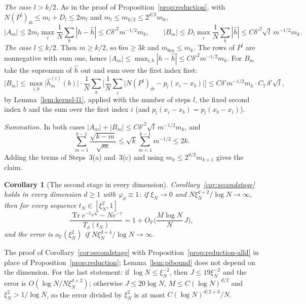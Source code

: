 \documentclass[11pt,a4paper]{article}
\makeatletter
\theoremstyle{stmt}
\newtheorem{corollary}[theorem]{Corollary}
\theoremstyle{defn}
\theoremstyle{rmk}
\renewenvironment{proof}[1][\proofname]{\par\pushQED{\qed}\normalfont\topsep6\p@\@plus6\p@\relax
  \trivlist\item[\hskip\labelsep{\sffamily\itshape\small #1.}]\ignorespaces}{\popQED\endtrivlist\@endpefalse}
\numberwithin{equation}{section}
\DeclareMathOperator{\Tr}{Tr}
\newcommand{\Lc}{\mathcal{L}}
\makeatother
\begin{document}
{\begin{proof}
\emph{The case $l>k/2$.} As in the proof of Proposition~\ref{prop:reduction}, with
$N(P^l)_{ib}\le m_l+D_l\le2m_l$ and $m_l\le m_{k/2}\le2^{d/2}m_k$,
\[
 |A_m|\le2m_l\max_i\frac1N\sum_b|h-\hat h|\le C\delta'^2m^{-1/2}m_k,\qquad
 |B_m|\le D_l\max_i\frac1N\sum_b|\hat h|\le C\delta'^2\sqrt l\,m^{-1/2}m_k .
\]
\emph{The case $l\le k/2$.} Then $m\ge k/2$, so $6m\ge3k$ and $m_{6m}\le m_k$. The rows of $P^l$ are
nonnegative with sum one, hence $|A_m|\le\max_{i,b}|h-\hat h|\le C\delta'^2m^{-1/2}m_k$. For $B_m$ take the
supremum of $\hat h$ out and sum over the first index first:
\[
 |B_m|\le\max_{i,b}\big|\hat h^{(i)}_m(b)\big|\cdot\frac1N\sum_b\Big[\frac1N\sum_i\big|N(P^l)_{ib}-p_l(x_i-x_b)\big|\Big]
 \le C\delta'm^{-1/2}m_k\cdot C_7\,\delta'\sqrt l ,
\]
by Lemma~\ref{lem:kernel-l1}, applied with the number of steps $l$, the fixed second index $b$ and the
sum over the first index $i$ (and $p_l(x_i-x_b)=p_l(x_b-x_i)$).

\emph{Summation.} In both cases $|A_m|+|B_m|\le C\delta'^2\sqrt l\,m^{-1/2}m_k$, and
\[
 \sum_{m=1}^{k-1}\frac{\sqrt{k-m}}{\sqrt m}\le\sqrt k\sum_{m=1}^{k-1}m^{-1/2}\le2k .
\]
Adding the terms of Steps~3(a) and~3(c) and using $m_k\le2^{d/2}m_{k+1}$ gives the claim.
\end{proof}

\begin{corollary}[The second stage in every dimension]\label{cor:secondstage-alld}
Corollary~\ref{cor:secondstage} holds in every dimension $d\ge1$ with $\varphi_d\equiv1$: if $\xi_N\to0$
and $N\xi_N^{d+2}/\log N\to\infty$, then for every sequence $t_N\in[\xi_N^2,1]$
\[
 \frac{\Tr e^{-t_N\Lc}-Ne^{-\tau}}{T_\sigma(t_N)}=1+O_{\mathbb P}\Big(\frac{M\log N}{N}\,J\Big),
\]
and the error is $o_{\mathbb P}(\xi_N^2)$ if $N\xi_N^{d+4}/\log N\to\infty$.
\end{corollary}

\begin{proof}
The proof of Corollary~\ref{cor:secondstage} with Proposition~\ref{prop:reduction-alld} in place of
Proposition~\ref{prop:reduction}; Lemma~\ref{lem:pibound} does not depend on the dimension. For the last
statement: if $\log N\le\xi_N^{-2}$, then $J\le19\xi_N^{-2}$ and the error is $O(\log N/N\xi_N^{d+2})$;
otherwise $J\le20\log N$, $M\le C(\log N)^{d/2}$ and $\xi_N^2>1/\log N$, so the error divided by $\xi_N^2$ is
at most $C(\log N)^{d/2+3}/N$.
\end{proof}

}
\end{document}
